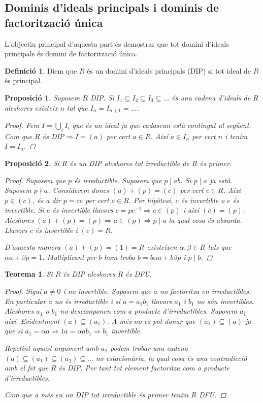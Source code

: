 \documentclass[a4paper,11pt]{report}
\newcommand{\inv}[1]{#1^{-1}}
\newcommand{\im}{\Rightarrow}
\theoremstyle{theorem}
\newtheorem{proposicio}{\normalfont \sffamily\bfseries Proposició}[section]
\newtheorem{teorema}{\normalfont \sffamily\bfseries Teorema}[section]
\theoremstyle{definition}
\newtheorem{definicio}{\normalfont\sffamily\bfseries Definició}[section]
\begin{document}
\subsection{Dominis d'ideals principals i dominis de factorització única}
L'objectiu principal d'aquesta part és demostrar que tot domini d'ideals principals és domini de factorització única.
\begin{definicio}
	Diem que $R$ és un domini d'ideals principals (DIP) si tot ideal de $R$ és principal.
\end{definicio}
\begin{proposicio}
	Suposem $R$ DIP. Si $I_1\subseteq I_2\subseteq I_3\subseteq\ldots$ és una cadena d'ideals de $R$ aleshores existeix $n$ tal que $I_n=I_{n+1}=\ldots$.\begin{proof}
		Fem $I=\bigcup_i I_i$ que és un ideal ja que cadascun està contingut al següent. Com que $R$ és DIP$\im I=(a)$ per cert $a\in R$. Així $a\in I_n$ per cert $n$ i tenim $I=I_n$.
	\end{proof}
\end{proposicio}
\begin{proposicio}
	Si $R$ és un DIP aleshores tot irreductible de $R$ és primer.\begin{proof}
		Suposem que $p$ és irreductible. Suposem que $p\mid ab$. Si $p\mid a$ ja està. Suposem $p\nmid a$. Considerem doncs $(a)+(p)=(c)$ per cert $c\in R$. Així $p\in (c)$, és a dir $p=ce$ per cert $e\in R$. Per hipòtesi, $c$ és invertible o $e$ és invertible. Si $e$ és invertible llavors $c=p\inv{e}\im c\in (p)$ i així $(c)=(p)$. Aleshores $(a)+(p)=(p)\im a\in (p)\im p\mid a$ la qual cosa és absurda. Llavors $c$ és invertible i $(c)=R$. 
		
		D'aquesta manera $(a)+(p)=(1)=R$ existeixen $\alpha,\beta\in R$  tals que $\alpha a+\beta p=1$. Multiplicant per $b$ hom troba $b=b\alpha a+b\beta p$ i $p\mid b$.
	\end{proof}
\end{proposicio}
\begin{teorema}
	Si $R$ és DIP aleshores $R$ és DFU.\begin{proof}
		Sigui $a\neq 0$ i no invertible. Suposem que $a$ no factoritza en irreductibles. En particular $a$ no és irreductible i si $a=a_1b_1$ llavors $a_1$ i $b_1$ no són invertibles. Aleshores $a_1$ o $b_1$ no descomponen com a producte d'irreductibles. Suposem $a_1$ així. Evidentment $(a)\subseteq (a_1)$. A més no es pot donar que $(a_1)\subseteq (a)$ ja que si $a_1=\alpha a\im 1a=\alpha a b_1\im b_1$ invertible.
		
		Repetint aquest argument amb $a_1$ podem trobar una cadena $(a) \subseteq (a_1)\subseteq (a_2)\subseteq\ldots$ no estacionària, la qual cosa és una contradicció amb el fet que $R$ és DIP. Per tant tot element factoritza com a producte d'irreductibles.
		
		Com que a més en un DIP tot irreductible és primer tenim $R$ DFU.
	\end{proof}
\end{teorema}
\end{document}
